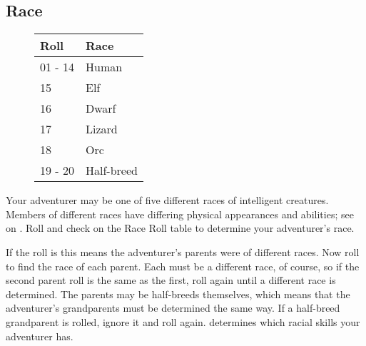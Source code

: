 \begin{multicols*}{2}
\section{Race}
\begin{wrapfigure}[9]{l}[0pt]{85pt}
\begin{normbox}
\small
\begin{tabular}{@{}l l}
\textbf{Roll} & \textbf{Race}\\
\midrule
01 - 14 & Human\\
15 & Elf\\
16 & Dwarf \\
17 & Lizard\\
18 & Orc\\
19 - 20 & Half-breed
\end{tabular}
\end{normbox}\smallskip
\end{wrapfigure}
Your adventurer may be one of five different races of intelligent creatures. Members of different races have differing physical appearances and abilities; see  on . Roll  and check on the Race Roll table to determine your adventurer's race.

If the roll is  this means the adventurer's parents were of different races. Now roll to find the race of each parent. Each must be a different race, of course, so if the second parent roll is the same as the first, roll again until a different race is determined. The parents may be half-breeds themselves, which means that the adventurer's grandparents must be determined the same way. If a half-breed grandparent is rolled, ignore it and roll again.  determines which racial skills your adventurer has. 


\end{multicols*}
